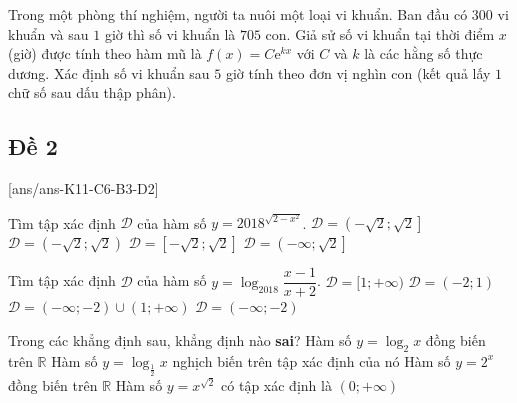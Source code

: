 \begin{ex}%
	Trong một phòng thí nghiệm, người ta nuôi một loại vi khuẩn. Ban đầu có $300$ vi khuẩn và sau $1$ giờ thì số vi khuẩn là $705$ con. Giả sử số vi khuẩn tại thời điểm $x$ (giờ) được tính theo hàm mũ là $f(x) = C\mathrm{e}^{kx}$ với $C$ và $k$ là các hằng số thực dương. Xác định số vi khuẩn sau $5$ giờ tính theo đơn vị nghìn con (kết quả lấy $1$ chữ số sau dấu thập phân).
\end{ex}




\subsection{Đề 2}

[ans/ans-K11-C6-B3-D2]
\caulc

\begin{ex}%
	Tìm tập xác định $\mathscr{D}$ của hàm số $y=2018^{\sqrt{2-x^2}}$.
	\choice
	{$\mathscr{D}=\left(-\sqrt{2};\sqrt{2}\right]$}
	{$\mathscr{D}=\left(-\sqrt{2};\sqrt{2}\right)$}
	{\True $\mathscr{D}=\left[-\sqrt{2};\sqrt{2}\right]$}
	{$\mathscr{D}=\left(-\infty;\sqrt{2}\right]$}
\end{ex}

\begin{ex}%
	Tìm tập xác định $\mathscr{D}$ của hàm số $y=\log _{2018} \dfrac{x-1}{x+2}$.
	\choice
	{$\mathscr{D}=[1 ; + \infty)$}
	{$\mathscr{D}=( - 2 ; 1)$}
	{\True $\mathscr{D}=( - \infty ; - 2)\cup(1 ; + \infty)$}
	{$\mathscr{D}=( - \infty ; - 2)$}
\end{ex}

\begin{ex}%
	Trong các khẳng định sau, khẳng định nào \textbf{sai}?
	\choice
	{\True Hàm số $y = \log_{2}x$ đồng biến trên $\mathbb{R}$}
	{Hàm số $y = \log_{\frac{1}{2}}x$ nghịch biến trên tập xác định của nó}
	{Hàm số $y = 2^x$ đồng biến trên $\mathbb{R}$}
	{Hàm số $y = x^{\sqrt{2}}$ có tập xác định là $\left(0; +\infty\right)$}
\end{ex}


